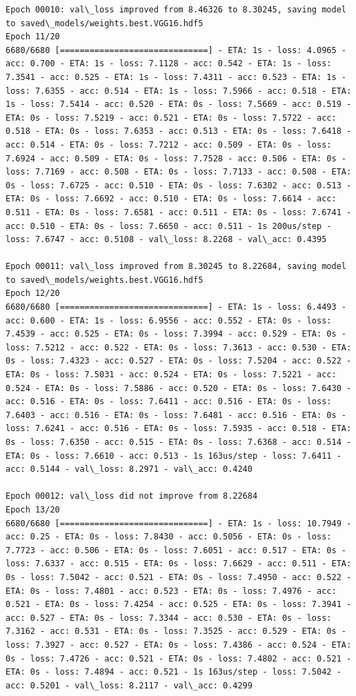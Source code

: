 \documentclass[11pt]{article}
\begin{document}
\begin{Verbatim}[commandchars=\\\{\}]
Epoch 00010: val\_loss improved from 8.46326 to 8.30245, saving model to saved\_models/weights.best.VGG16.hdf5
Epoch 11/20
6680/6680 [==============================] - ETA: 1s - loss: 4.0965 - acc: 0.700 - ETA: 1s - loss: 7.1128 - acc: 0.542 - ETA: 1s - loss: 7.3541 - acc: 0.525 - ETA: 1s - loss: 7.4311 - acc: 0.523 - ETA: 1s - loss: 7.6355 - acc: 0.514 - ETA: 1s - loss: 7.5966 - acc: 0.518 - ETA: 1s - loss: 7.5414 - acc: 0.520 - ETA: 0s - loss: 7.5669 - acc: 0.519 - ETA: 0s - loss: 7.5219 - acc: 0.521 - ETA: 0s - loss: 7.5722 - acc: 0.518 - ETA: 0s - loss: 7.6353 - acc: 0.513 - ETA: 0s - loss: 7.6418 - acc: 0.514 - ETA: 0s - loss: 7.7212 - acc: 0.509 - ETA: 0s - loss: 7.6924 - acc: 0.509 - ETA: 0s - loss: 7.7528 - acc: 0.506 - ETA: 0s - loss: 7.7169 - acc: 0.508 - ETA: 0s - loss: 7.7133 - acc: 0.508 - ETA: 0s - loss: 7.6725 - acc: 0.510 - ETA: 0s - loss: 7.6302 - acc: 0.513 - ETA: 0s - loss: 7.6692 - acc: 0.510 - ETA: 0s - loss: 7.6614 - acc: 0.511 - ETA: 0s - loss: 7.6581 - acc: 0.511 - ETA: 0s - loss: 7.6741 - acc: 0.510 - ETA: 0s - loss: 7.6650 - acc: 0.511 - 1s 200us/step - loss: 7.6747 - acc: 0.5108 - val\_loss: 8.2268 - val\_acc: 0.4395

Epoch 00011: val\_loss improved from 8.30245 to 8.22684, saving model to saved\_models/weights.best.VGG16.hdf5
Epoch 12/20
6680/6680 [==============================] - ETA: 1s - loss: 6.4493 - acc: 0.600 - ETA: 1s - loss: 6.9556 - acc: 0.552 - ETA: 0s - loss: 7.4539 - acc: 0.525 - ETA: 0s - loss: 7.3994 - acc: 0.529 - ETA: 0s - loss: 7.5212 - acc: 0.522 - ETA: 0s - loss: 7.3613 - acc: 0.530 - ETA: 0s - loss: 7.4323 - acc: 0.527 - ETA: 0s - loss: 7.5204 - acc: 0.522 - ETA: 0s - loss: 7.5031 - acc: 0.524 - ETA: 0s - loss: 7.5221 - acc: 0.524 - ETA: 0s - loss: 7.5886 - acc: 0.520 - ETA: 0s - loss: 7.6430 - acc: 0.516 - ETA: 0s - loss: 7.6411 - acc: 0.516 - ETA: 0s - loss: 7.6403 - acc: 0.516 - ETA: 0s - loss: 7.6481 - acc: 0.516 - ETA: 0s - loss: 7.6241 - acc: 0.516 - ETA: 0s - loss: 7.5935 - acc: 0.518 - ETA: 0s - loss: 7.6350 - acc: 0.515 - ETA: 0s - loss: 7.6368 - acc: 0.514 - ETA: 0s - loss: 7.6610 - acc: 0.513 - 1s 163us/step - loss: 7.6411 - acc: 0.5144 - val\_loss: 8.2971 - val\_acc: 0.4240

Epoch 00012: val\_loss did not improve from 8.22684
Epoch 13/20
6680/6680 [==============================] - ETA: 1s - loss: 10.7949 - acc: 0.25 - ETA: 0s - loss: 7.8430 - acc: 0.5056 - ETA: 0s - loss: 7.7723 - acc: 0.506 - ETA: 0s - loss: 7.6051 - acc: 0.517 - ETA: 0s - loss: 7.6337 - acc: 0.515 - ETA: 0s - loss: 7.6629 - acc: 0.511 - ETA: 0s - loss: 7.5042 - acc: 0.521 - ETA: 0s - loss: 7.4950 - acc: 0.522 - ETA: 0s - loss: 7.4801 - acc: 0.523 - ETA: 0s - loss: 7.4976 - acc: 0.521 - ETA: 0s - loss: 7.4254 - acc: 0.525 - ETA: 0s - loss: 7.3941 - acc: 0.527 - ETA: 0s - loss: 7.3344 - acc: 0.530 - ETA: 0s - loss: 7.3162 - acc: 0.531 - ETA: 0s - loss: 7.3525 - acc: 0.529 - ETA: 0s - loss: 7.3927 - acc: 0.527 - ETA: 0s - loss: 7.4386 - acc: 0.524 - ETA: 0s - loss: 7.4726 - acc: 0.521 - ETA: 0s - loss: 7.4802 - acc: 0.521 - ETA: 0s - loss: 7.4894 - acc: 0.521 - 1s 163us/step - loss: 7.5042 - acc: 0.5201 - val\_loss: 8.2117 - val\_acc: 0.4299


\end{Verbatim}
\end{document}
